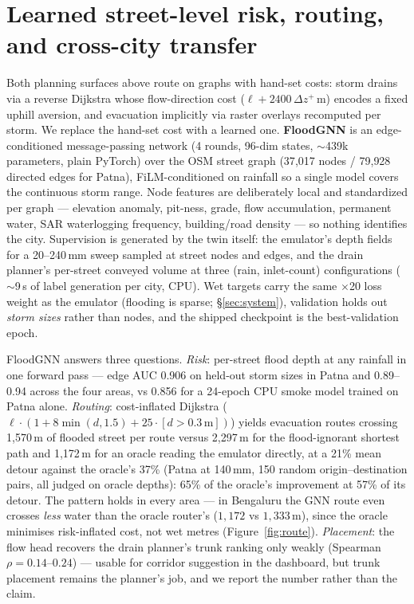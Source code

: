 \documentclass[10pt]{article}
\begin{document}
\section{Learned street-level risk, routing, and cross-city transfer}
\label{sec:gnn}
Both planning surfaces above route on graphs with hand-set costs: storm drains via a reverse
Dijkstra whose flow-direction cost ($\ell + 2400\,\Delta z^{+}$\,m) encodes a fixed uphill aversion,
and evacuation implicitly via raster overlays recomputed per storm. We replace the hand-set cost
with a learned one. \textbf{FloodGNN} is an edge-conditioned message-passing network
\citep{gilmer2017} (4 rounds, 96-dim states, $\sim$439k parameters, plain PyTorch) over the OSM
street graph (37{,}017 nodes / 79{,}928 directed edges for Patna), FiLM-conditioned on rainfall
\citep{perez2018film} so a single model covers the continuous storm range. Node features are
deliberately local and standardized per graph --- elevation anomaly, pit-ness, grade, flow
accumulation, permanent water, SAR waterlogging frequency, building/road density --- so nothing
identifies the city. Supervision is generated by the twin itself: the emulator's depth fields for a
20--240\,mm sweep sampled at street nodes and edges, and the drain planner's per-street conveyed
volume at three (rain, inlet-count) configurations ($\sim$9\,s of label generation per city, CPU).
Wet targets carry the same $\times$20 loss weight as the emulator (flooding is sparse;
\S\ref{sec:system}), validation holds out \emph{storm sizes} rather than nodes, and the shipped
checkpoint is the best-validation epoch.

FloodGNN answers three questions. \emph{Risk}: per-street flood depth at any rainfall in one
forward pass --- edge AUC 0.906 on held-out storm sizes in Patna and 0.89--0.94 across the four
areas, vs 0.856 for a 24-epoch CPU smoke model trained on Patna alone. \emph{Routing}:
cost-inflated Dijkstra ($\ell \cdot (1 + 8\min(d,1.5) + 25\cdot[d>0.3\,\text{m}])$) yields
evacuation routes crossing 1{,}570\,m of flooded street per route versus 2{,}297\,m for the
flood-ignorant shortest path and 1{,}172\,m for an oracle reading the emulator directly, at a
21\% mean detour against the oracle's 37\% (Patna at 140\,mm, 150 random origin--destination
pairs, all judged on oracle depths): 65\% of the oracle's improvement at 57\% of its detour. The
pattern holds in every area --- in Bengaluru the GNN route even crosses \emph{less} water than
the oracle router's ($1{,}172$ vs $1{,}333$\,m), since the oracle minimises risk-inflated cost,
not wet metres (Figure~\ref{fig:route}). \emph{Placement}: the flow head recovers the drain
planner's trunk ranking only weakly (Spearman $\rho=0.14$--$0.24$) --- usable for corridor
suggestion in the dashboard, but trunk placement remains the planner's job, and we report the
number rather than the claim.
\end{document}
